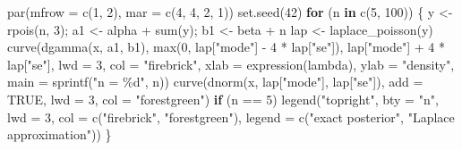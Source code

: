 \documentclass[
  letterpaper,
  DIV=11,
  numbers=noendperiod]{scrreprt}
\newenvironment{Shaded}{\begin{snugshade}}{\end{snugshade}}
\newcommand{\AttributeTok}[1]{\textcolor[rgb]{0.40,0.45,0.13}{#1}}
\newcommand{\ConstantTok}[1]{\textcolor[rgb]{0.56,0.35,0.01}{#1}}
\newcommand{\ControlFlowTok}[1]{\textcolor[rgb]{0.00,0.23,0.31}{\textbf{#1}}}
\newcommand{\DecValTok}[1]{\textcolor[rgb]{0.68,0.00,0.00}{#1}}
\newcommand{\FunctionTok}[1]{\textcolor[rgb]{0.28,0.35,0.67}{#1}}
\newcommand{\NormalTok}[1]{\textcolor[rgb]{0.00,0.23,0.31}{#1}}
\newcommand{\OtherTok}[1]{\textcolor[rgb]{0.00,0.23,0.31}{#1}}
\newcommand{\SpecialCharTok}[1]{\textcolor[rgb]{0.37,0.37,0.37}{#1}}
\newcommand{\StringTok}[1]{\textcolor[rgb]{0.13,0.47,0.30}{#1}}
\begin{document}
\begin{Shaded}
\begin{Highlighting}[]
\FunctionTok{par}\NormalTok{(}\AttributeTok{mfrow =} \FunctionTok{c}\NormalTok{(}\DecValTok{1}\NormalTok{, }\DecValTok{2}\NormalTok{), }\AttributeTok{mar =} \FunctionTok{c}\NormalTok{(}\DecValTok{4}\NormalTok{, }\DecValTok{4}\NormalTok{, }\DecValTok{2}\NormalTok{, }\DecValTok{1}\NormalTok{))}
\FunctionTok{set.seed}\NormalTok{(}\DecValTok{42}\NormalTok{)}
\ControlFlowTok{for}\NormalTok{ (n }\ControlFlowTok{in} \FunctionTok{c}\NormalTok{(}\DecValTok{5}\NormalTok{, }\DecValTok{100}\NormalTok{)) \{}
\NormalTok{  y }\OtherTok{\textless{}{-}} \FunctionTok{rpois}\NormalTok{(n, }\DecValTok{3}\NormalTok{); a1 }\OtherTok{\textless{}{-}}\NormalTok{ alpha }\SpecialCharTok{+} \FunctionTok{sum}\NormalTok{(y); b1 }\OtherTok{\textless{}{-}}\NormalTok{ beta }\SpecialCharTok{+}\NormalTok{ n}
\NormalTok{  lap }\OtherTok{\textless{}{-}} \FunctionTok{laplace\_poisson}\NormalTok{(y)}
  \FunctionTok{curve}\NormalTok{(}\FunctionTok{dgamma}\NormalTok{(x, a1, b1), }\FunctionTok{max}\NormalTok{(}\DecValTok{0}\NormalTok{, lap[}\StringTok{"mode"}\NormalTok{] }\SpecialCharTok{{-}} \DecValTok{4} \SpecialCharTok{*}\NormalTok{ lap[}\StringTok{"se"}\NormalTok{]), lap[}\StringTok{"mode"}\NormalTok{] }\SpecialCharTok{+} \DecValTok{4} \SpecialCharTok{*}\NormalTok{ lap[}\StringTok{"se"}\NormalTok{],}
        \AttributeTok{lwd =} \DecValTok{3}\NormalTok{, }\AttributeTok{col =} \StringTok{"firebrick"}\NormalTok{, }\AttributeTok{xlab =} \FunctionTok{expression}\NormalTok{(lambda), }\AttributeTok{ylab =} \StringTok{"density"}\NormalTok{,}
        \AttributeTok{main =} \FunctionTok{sprintf}\NormalTok{(}\StringTok{"n = \%d"}\NormalTok{, n))}
  \FunctionTok{curve}\NormalTok{(}\FunctionTok{dnorm}\NormalTok{(x, lap[}\StringTok{"mode"}\NormalTok{], lap[}\StringTok{"se"}\NormalTok{]), }\AttributeTok{add =} \ConstantTok{TRUE}\NormalTok{, }\AttributeTok{lwd =} \DecValTok{3}\NormalTok{, }\AttributeTok{col =} \StringTok{"forestgreen"}\NormalTok{)}
  \ControlFlowTok{if}\NormalTok{ (n }\SpecialCharTok{==} \DecValTok{5}\NormalTok{) }\FunctionTok{legend}\NormalTok{(}\StringTok{"topright"}\NormalTok{, }\AttributeTok{bty =} \StringTok{"n"}\NormalTok{, }\AttributeTok{lwd =} \DecValTok{3}\NormalTok{, }\AttributeTok{col =} \FunctionTok{c}\NormalTok{(}\StringTok{"firebrick"}\NormalTok{, }\StringTok{"forestgreen"}\NormalTok{),}
                      \AttributeTok{legend =} \FunctionTok{c}\NormalTok{(}\StringTok{"exact posterior"}\NormalTok{, }\StringTok{"Laplace approximation"}\NormalTok{))}
\NormalTok{\}}
\end{Highlighting}
\end{Shaded}
\end{document}
